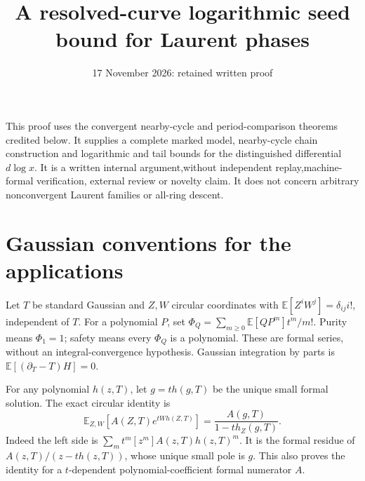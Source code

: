 \documentclass[11pt]{article}
\title{A resolved-curve logarithmic seed bound for Laurent phases}
\author{}\date{17 November 2026: retained written proof}
\theoremstyle{definition}\newtheorem{definition}[theorem]{Definition}
\theoremstyle{remark}\newtheorem{remark}[theorem]{Remark}
\newcommand{\E}{\mathbb E}
\begin{document}
\maketitle
This proof uses the convergent nearby-cycle and period-comparison
theorems credited below. It supplies a complete marked model,
nearby-cycle chain construction and logarithmic and tail bounds for
the distinguished differential $d\log x$. It is a written internal
argument,without independent replay,machine-formal verification,
external review or novelty claim. It does not concern arbitrary
nonconvergent Laurent families or all-ring descent.
\section{Gaussian conventions for the applications}
Let $T$ be standard Gaussian and $Z,W$ circular coordinates with
$\E[Z^iW^j]=\delta_{ij}i!$, independent of $T$. For a polynomial
$P$, set $\Phi_Q=\sum_{m\geq0}\E[QP^m]t^m/m!$. Purity means
$\Phi_1=1$; safety means every $\Phi_Q$ is a polynomial.
These are formal series, without an integral-convergence hypothesis.
Gaussian integration by parts is $\E[(\partial_T-T)H]=0$.

For any polynomial $h(z,T)$, let $g=th(g,T)$ be the unique small
formal solution. The exact circular identity is
\[
 \E_{Z,W}[A(Z,T)e^{tWh(Z,T)}]
       =\frac{A(g,T)}{1-th_Z(g,T)}.
\]
Indeed the left side is $\sum_m t^m[z^m]A(z,T)h(z,T)^m$.
It is the formal residue of $A(z,T)/(z-th(z,T))$, whose unique
small pole is $g$. This also proves the identity for a
$t$-dependent polynomial-coefficient formal numerator $A$.
\end{document}
